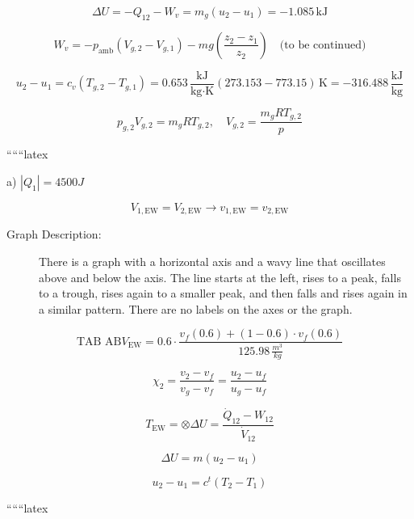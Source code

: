 \[
\Delta U = -Q_{12} - W_{v} = m_g (u_2 - u_1) = -1.085 \, \text{kJ}
\]

\[
W_v = -p_{\text{amb}} (V_{g,2} - V_{g,1}) - mg \left( \frac{z_2 - z_1}{z_2} \right) \quad \text{(to be continued)}
\]

\[
u_2 - u_1 = c_v (T_{g,2} - T_{g,1}) = 0.653 \, \frac{\text{kJ}}{\text{kg} \cdot \text{K}} (273.153 - 773.15) \, \text{K} = -316.488 \, \frac{\text{kJ}}{\text{kg}}
\]

\[
p_{g,2} V_{g,2} = m_g R T_{g,2}, \quad V_{g,2} = \frac{m_g R T_{g,2}}{p}
\]

``````latex


a) \(\left|Q_1\right| = 4500 J\)

\[ V_{1, \text{EW}} = V_{2, \text{EW}} \rightarrow v_{1, \text{EW}} = v_{2, \text{EW}} \]

\begin{description}
    \item[Graph Description:] 
    There is a graph with a horizontal axis and a wavy line that oscillates above and below the axis. The line starts at the left, rises to a peak, falls to a trough, rises again to a smaller peak, and then falls and rises again in a similar pattern. There are no labels on the axes or the graph.
\end{description}

\[ \text{TAB AB} V_{\text{EW}} = 0.6 \cdot \frac{v_f(0.6) + (1-0.6) \cdot v_f(0.6)}{125.98 \, \frac{m^3}{kg}} \]

\[ \chi_2 = \frac{v_2 - v_f}{v_g - v_f} = \frac{u_2 - u_f}{u_g - u_f} \]

\[ T_{\text{EW}} = \otimes \Delta U = \frac{\dot{Q}_{12} - W_{12}}{\dot{V}_{12}} \]

\[ \Delta U = m(u_2 - u_1) \]

\[ u_2 - u_1 = c^t(T_2 - T_1) \]

``````latex


